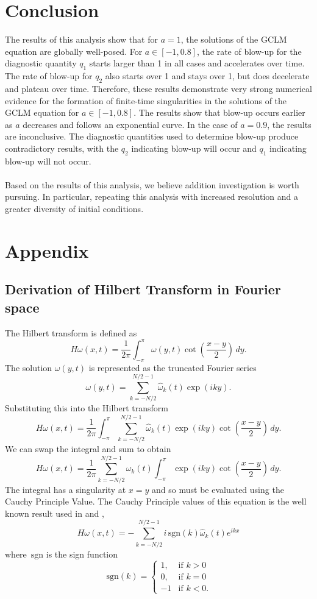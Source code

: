 \documentclass[12pt]{article}
\def\w{\omega}
\def\wk{\hat{\omega}_k}
\def\sgn{\,\text{sgn}}
\numberwithin{equation}{section}
\begin{document}
\section{Conclusion}

The results of this analysis show that for $a=1$, the solutions of the GCLM equation are globally well-posed. For $a\in[-1,0.8]$, the rate of blow-up for the diagnostic quantity $q_1$ starts larger than 1 in all cases and accelerates over time. The rate of blow-up for $q_2$ also starts over 1 and stays over 1, but does decelerate and plateau over time. Therefore, these results demonstrate very strong numerical evidence for the formation of finite-time singularities in the solutions of the GCLM equation for $a\in[-1,0.8]$. The results show that blow-up occurs earlier as $a$ decreases and follows an exponential curve. In the case of $a=0.9$, the results are inconclusive. The diagnostic quantities used to determine blow-up produce contradictory results, with the $q_2$ indicating blow-up will occur and $q_1$ indicating blow-up will not occur. 
\\~\\
Based on the results of this analysis, we believe addition investigation is worth pursuing. In particular, repeating this analysis with increased resolution and a greater diversity of initial conditions. 

\section{Appendix}
\subsection{Derivation of Hilbert Transform in Fourier space}
The Hilbert transform is defined as
$$H\w(x,t) = \frac{1}{2\pi}\int_{-\pi}^{\pi}\w(y,t)\cot\left(\frac{x-y}{2}\right)\,dy.$$
The solution $\w(y,t)$ is represented as the truncated Fourier series
$$\w(y,t) = \sum_{k=-N/2}^{N/2 - 1}\wk(t)\exp(iky).$$
Substituting this into the Hilbert transform
$$H\w(x,t) = \frac{1}{2\pi}\int_{-\pi}^{\pi}\sum_{k=-N/2}^{N/2 - 1}\wk(t)\exp(iky)\cot\left(\frac{x-y}{2}\right)\,dy.$$
We can swap the integral and sum to obtain
$$H\w(x,t) = \frac{1}{2\pi}\sum_{k=-N/2}^{N/2 - 1}\wk(t) \int_{-\pi}^{\pi} \exp(iky)\cot\left(\frac{x-y}{2}\right)\,dy.$$
The integral has a singularity at $x=y$ and so must be evaluated using the Cauchy Principle Value. The Cauchy Principle values of this equation is the well known result used in \cite{hideki_numerical_2006} and \cite{okamoto_generalization_2008},
$$H\w(x,t) = -\sum_{k=-N/2}^{N/2 - 1}i \sgn(k)\wk(t)e^{ikx}$$
where $\sgn$ is the sign function 
$$\sgn(k) = \begin{cases}
  1, & \text{if } k > 0 \\
  0, & \text{if } k = 0 \\
  -1 & \text{if } k < 0.
\end{cases}$$
\end{document}
